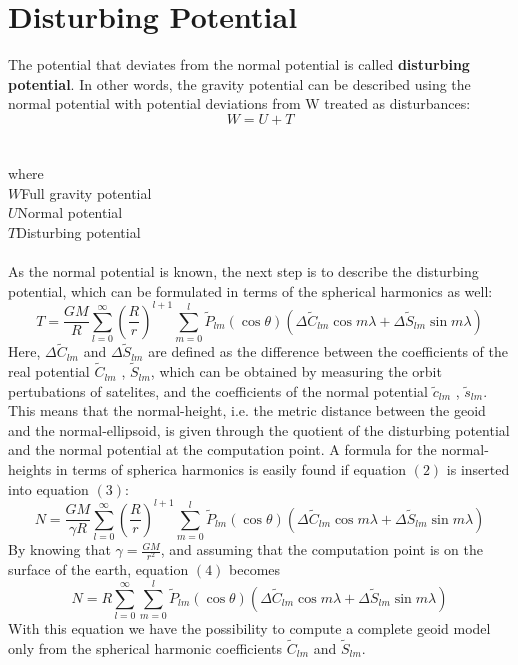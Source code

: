 \documentclass[a4paper,12pt]{report}
\newcommand\tab[1][1cm]{\hspace*{#1}}
\begin{document}
\section{Disturbing Potential}
The potential that deviates from the normal potential is called \textbf{disturbing potential}. In other words, the gravity potential can be described using the normal potential with
potential deviations from W treated as disturbances:
\begin{equation} 
W=U+T
\end{equation}
\\\\where
\\$W$\tab Full gravity potential
\\$U$\tab Normal potential
\\$T$\tab Disturbing potential
\\\\As the normal potential is known, the next step is to describe the disturbing potential, which can be formulated in terms of the spherical harmonics as well:
\begin{equation}
T=\frac{GM}{R}\sum_{l=0}^{\infty} \left(\frac{R}{r}\right)^{l+1}\sum_{m=0}^{l} \widetilde{P}_{lm}(\cos\theta)(\Delta\widetilde{C}_{lm}\cos m\lambda + \Delta\widetilde{S}_{lm}\sin m\lambda)
\end{equation}
Here, $\Delta\widetilde{C}_{lm}$ and $\Delta\widetilde{S}_{lm}$ are defined as the difference between the coefficients of the real potential $\widetilde{C}_{lm}$ , $\widetilde{S}_{lm}$, which can be obtained by measuring the orbit pertubations of satelites, and the coefficients of the normal potential $\widetilde{c}_{lm}$ , $	\widetilde{s}_{lm}$.
This means that the normal-height, i.e. the metric distance between the geoid and
the normal-ellipsoid, is given through the quotient of the disturbing potential and the
normal potential at the computation point. A formula for the normal-heights in terms
of spherica harmonics is easily found if equation $(2)$ is inserted into equation $(3)$:
\begin{equation}
N=\frac{GM}{\gamma R}\sum_{l=0}^{\infty} \left(\frac{R}{r}\right)^{l+1}\sum_{m=0}^{l} \widetilde{P}_{lm}(\cos\theta)(\Delta\widetilde{C}_{lm}\cos m\lambda + \Delta\widetilde{S}_{lm}\sin m\lambda)
\end{equation}
By knowing that $\gamma=\frac{GM}{r^2}$, and assuming that the computation point is on the surface of the earth, equation $(4)$ becomes
\begin{equation}
N=R\sum_{l=0}^{\infty}\sum_{m=0}^{l} \widetilde{P}_{lm}(\cos\theta)(\Delta\widetilde{C}_{lm}\cos m\lambda + \Delta\widetilde{S}_{lm}\sin m\lambda)
\end{equation}
With this equation we have the possibility to compute a complete geoid model only from
the spherical harmonic coefficients $\widetilde{C}_{lm}$ and $\widetilde{S}_{lm}$.\\\\\\
\end{document}
